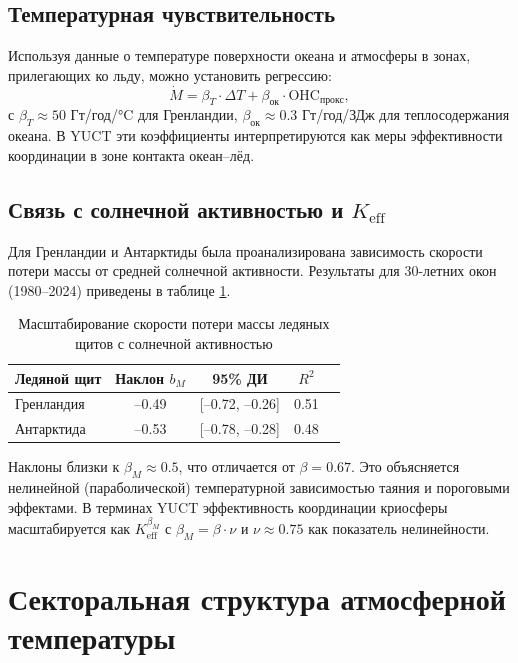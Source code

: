 \documentclass[12pt,a4paper]{article}
\newcommand{\Keff}{K_{\mathrm{eff}}}
\newcommand{\be}{\beta}
\begin{document}
	\subsection{Температурная чувствительность}
	
	Используя данные о температуре поверхности океана и атмосферы в зонах, прилегающих ко льду, можно установить регрессию:
	\[
	\dot{M} = \beta_T \cdot \Delta T + \beta_{\text{ок}} \cdot \text{OHC}_{\text{прокс}},
	\]
	с \(\beta_T \approx 50\) Гт/год/°C для Гренландии, \(\beta_{\text{ок}} \approx 0.3\) Гт/год/ЗДж для теплосодержания океана. В YUCT эти коэффициенты интерпретируются как меры эффективности координации в зоне контакта океан–лёд.
	
	\subsection{Связь с солнечной активностью и \(\Keff\)}
	
	Для Гренландии и Антарктиды была проанализирована зависимость скорости потери массы от средней солнечной активности. Результаты для 30-летних окон (1980–2024) приведены в таблице \ref{tab:icescaling}.
	
	\begin{table}[htbp]
		\centering
		\caption{Масштабирование скорости потери массы ледяных щитов с солнечной активностью}
		\label{tab:icescaling}
		\begin{tabular}{@{}lcccc@{}}
			\toprule
			Ледяной щит & Наклон \(b_M\) & 95\% ДИ & \(R^2\) \\
			\midrule
			Гренландия & –0.49 & [–0.72, –0.26] & 0.51 \\
			Антарктида & –0.53 & [–0.78, –0.28] & 0.48 \\
			\bottomrule
		\end{tabular}
	\end{table}
	
	Наклоны близки к \(\beta_M \approx 0.5\), что отличается от \(\be = 0.67\). Это объясняется нелинейной (параболической) температурной зависимостью таяния и пороговыми эффектами. В терминах YUCT эффективность координации криосферы масштабируется как \(\Keff^{\beta_M}\) с \(\beta_M = \be \cdot \nu\) и \(\nu \approx 0.75\) как показатель нелинейности.
	
	\section{Секторальная структура атмосферной температуры}
	
\end{document}

